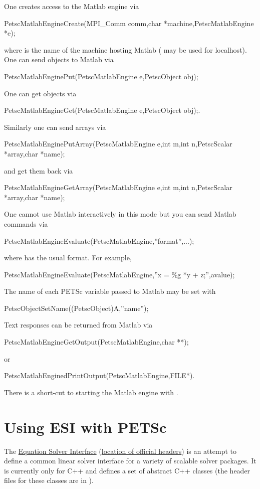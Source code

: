 One creates access to the Matlab engine via 
\begin{tabbing}
  PetscMatlabEngineCreate(MPI\_Comm comm,char *machine,PetscMatlabEngine *e);
\end{tabbing}
where  is the name of the machine hosting Matlab ( may be used for localhost).
One can send objects to Matlab via 
\begin{tabbing}
  PetscMatlabEnginePut(PetscMatlabEngine e,PetscObject obj);
\end{tabbing}
One can get objects
via 
\begin{tabbing}
  PetscMatlabEngineGet(PetscMatlabEngine e,PetscObject obj);.
\end{tabbing}
Similarly one can send arrays via
\begin{tabbing}
  PetscMatlabEnginePutArray(PetscMatlabEngine e,int m,int n,PetscScalar *array,char *name);
\end{tabbing}
and get them back via
\begin{tabbing}
  PetscMatlabEngineGetArray(PetscMatlabEngine e,int m,int n,PetscScalar *array,char *name);
\end{tabbing}
One cannot use Matlab
interactively in this mode but you can send Matlab commands via
\begin{tabbing}
  PetscMatlabEngineEvaluate(PetscMatlabEngine,''format'',...);
\end{tabbing}
where  has the usual  format.
For example,
\begin{tabbing}
  PetscMatlabEngineEvaluate(PetscMatlabEngine,''x = \%g *y + z;'',avalue);
\end{tabbing}
The name of each PETSc variable passed to Matlab may be set with
\begin{tabbing}
PetscObjectSetName((PetscObject)A,''name'');
\end{tabbing}

Text responses can be returned from Matlab via 
\begin{tabbing}
  PetscMatlabEngineGetOutput(PetscMatlabEngine,char **); 
\end{tabbing}
or
\begin{tabbing}
PetscMatlabEnginedPrintOutput(PetscMatlabEngine,FILE*).
\end{tabbing}
There is a short-cut to starting the Matlab engine
with .


\cleardoublepage
\chapter{Using ESI with PETSc}
\label{ch_esi}  
The \href{http://z.ca.sandia.gov/esi}{Equation Solver Interface} 
(\href{http://www.eterascale.com/esi}{location of official headers}) 
is an attempt to 
define a common linear solver interface for a variety of scalable solver
packages. It is currently only for C++ and defines a set of abstract
C++ classes (the header files for these classes are in ).

